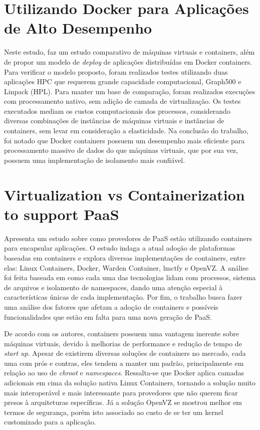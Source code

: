 \documentclass[twoside,english,brazilian]{UNISINOSartigo}
\begin{document}
\section{Utilizando Docker para Aplicações de Alto Desempenho}
\label{trabdocker1}
Neste estudo,  faz um estudo comparativo de máquinas virtuais e containers, além de propor um modelo de \textit{deploy} de aplicações distribuídas em Docker containers. Para verificar o modelo proposto, foram realizados testes utilizando duas aplicações HPC que requerem grande capacidade computacional, Graph500 e Linpack (HPL). Para manter um base de comparação, foram realizados execuções com processamento nativo, sem adição de camada de virtualização. Os testes executados mediam os custos computacionais dos processos, considerando diversas combinações de instâncias de máquinas virtuais e instâncias de containers, sem levar em consideração a elasticidade. Na conclusão do trabalho, foi notado que Docker containers possuem um desempenho mais eficiente para processamento massivo de dados do que máquinas virtuais, que por sua vez, possuem uma implementação de isolamento mais confiável. 

\section{Virtualization vs Containerization to support PaaS}
\label{trabdocker2}
\cite{Dua2014} Apresenta um estudo sobre como provedores de PaaS estão utilizando containers para encapsular aplicações. O estudo indaga a atual adoção de plataformas baseadas em containers e explora diversas implementações de containers, entre elas: Linux Containers, Docker, Warden Container, lmctfy e OpenVZ. A análise foi feita baseada em como cada uma das tecnologias lidam com processos, sistema de arquivos e isolamento de namespaces, dando uma atenção especial à características únicas de cada implementação. Por fim, o trabalho busca fazer uma análise dos fatores que afetam a adoção de containers e possíveis funcionalidades que estão em falta para uma nova geração de PaaS.

De acordo com os autores, containers possuem uma vantagem inerente sobre máquinas virtuais, devido à melhorias de performance e redução de tempo de \textit{start up}. Apesar de existirem diversas soluções de containers no mercado, cada uma com prós e contras, eles tendem a manter um padrão, principalmente em relação ao uso de \textit{chroot} e \textit{namespaces}. Ressalta-se que Docker aplica camadas adicionais em cima da solução nativa Linux Containers, tornando a solução muito mais interoperável e mais interessante para provedores que não querem ficar presos à arquiteturas específicas. Já a solução OpenVZ se mostrou melhor em termos de segurança, porém isto associado ao custo de se ter um kernel customizado para a aplicação.
\end{document}
